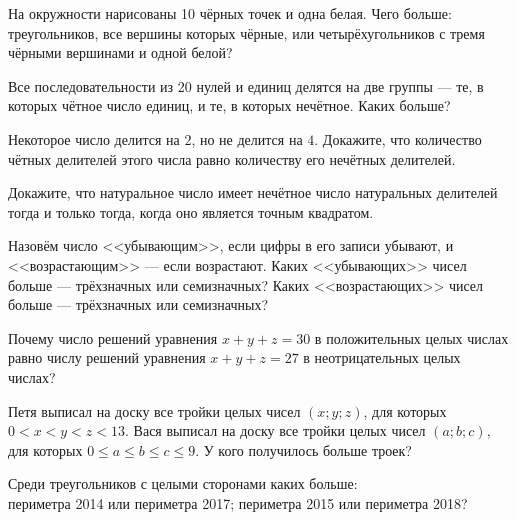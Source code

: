 \documentclass[12pt,a4paper]{article}
\begin{document}
\newpage






















\smallskip
{}
На окружности нарисованы 10 чёрных точек и одна
белая. Чего больше: треугольников,
все вершины которых чёрные, или четырёхугольников с
тремя чёрными вершинами и одной белой?

Все последовательности из 20 нулей и единиц делятся
на две группы --- те, в которых чётное число единиц, и те,
в которых нечётное. Каких больше?

Некоторое число делится на $2$, но не делится на $4$. Докажите, что
количество ч\"етных делителей этого числа равно количеству
его неч\"етных делителей.

Докажите, что натуральное число имеет нечётное число натуральных делителей тогда и только тогда,
когда оно является точным квадратом.

Назовём число <<убывающим>>, если цифры в его записи убывают, и <<возрастающим>> --- если возрастают.
 Каких <<убывающих>> чисел больше --- трёхзначных или семизначных?
 Каких <<возрастающих>> чисел больше --- трёхзначных или семизначных?

Почему число решений уравнения $x+y+z = 30$ в положительных целых числах равно числу решений уравнения
$x + y + z = 27$ в неотрицательных целых числах?

Петя выписал на доску все тройки целых чисел $(x;y;z)$, для которых $0<x<y<z<13$.
Вася выписал на доску все тройки целых чисел $(a;b;c)$, для которых $0\leq a\leq b\leq c\leq9$.
У кого получилось больше троек?

Среди треугольников с целыми сторонами
каких больше:\\
периметра 2014 или периметра 2017;
периметра 2015 или периметра 2018?


\end{document}
